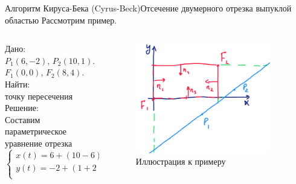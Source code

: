 \documentclass{beamer}
\begin{document}
\begin{frame}{Алгоритм Кируса-Бека (Cyrus-Beck)}{Отсечение двумерного отрезка выпуклой областью}
	Рассмотрим пример.

	\begin{columns}
		\begin{column}{0.5\textwidth}
			Дано: \\
			$P_1(6,-2)$, $P_2(10,1)$. \\
			$F_1(0,0)$, $F_2(8,4)$.
			\\
			Найти: 
			\\
			точку пересечения
			\\
			Решение:
			\\
			Составим параметрическое уравнение отрезка
			\[
				\begin{cases}
					x(t) = 6 + (10 - 6) t\\
					y(t) = -2 + (1 + 2) t\\
				\end{cases}	
			\]
		\end{column}
		\begin{column}{0.5\textwidth}
			\begin{figure} 
				\includegraphics[width=0.9\textwidth]{images/example_cyrus-beck.png}
				\caption {Иллюстрация к примеру}
			\end{figure}
		\end{column}
	\end{columns}





	\note{

}
\end{frame}
\end{document}
